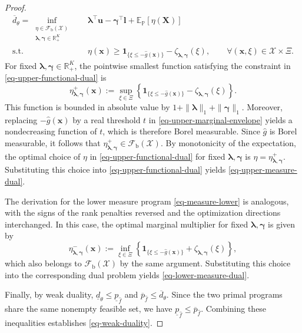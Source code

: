 \documentclass[review,11pt,3p,authoryear,nopreprintline]{elsarticle}
\begin{document}
\begin{proof}
  \begin{equation}
    \begin{aligned}
      \overline d_\theta
      =\inf_{\substack{\eta\in\mathcal F_{\mathrm b}(\mathcal X)\\
      \bm\lambda,\bm\gamma\in\mathbb R_+^K}}
      \quad &\bm\lambda^\top\bm u-\bm\gamma^\top\bm l+\mathbb E_{\mathbb P}\left[\eta(\bm X)\right]\\
      \text{s.t.}\quad & \eta(\bm x)\ge
      \mathbf1_{\{\xi\le-\hat g(\bm x)\}}
      -\zeta_{\bm\lambda,\bm\gamma}(\xi),
      \qquad\forall(\bm x,\xi)\in\mathcal X\times\Xi.
    \end{aligned}
    \label{eq-upper-functional-dual}
  \end{equation}
  For fixed $\bm\lambda,\bm\gamma\in\mathbb R_+^K$, the pointwise smallest function satisfying the constraint in \eqref{eq-upper-functional-dual} is
  \begin{equation}
    \eta^+_{\bm\lambda,\bm\gamma}(\bm x)
    :=\sup_{\xi\in\Xi}\left\{
      \mathbf1_{\{\xi\le-\hat g(\bm x)\}}
      -\zeta_{\bm\lambda,\bm\gamma}(\xi)
    \right\}.
    \label{eq-upper-marginal-envelope}
  \end{equation}
  This function is bounded in absolute value by $1+\|\bm\lambda\|_1+\|\bm\gamma\|_1$. Moreover, replacing $-\hat g(\bm x)$ by a real threshold $t$ in \eqref{eq-upper-marginal-envelope} yields a nondecreasing function of $t$, which is therefore Borel measurable. Since $\hat g$ is Borel measurable, it follows that $\eta^+_{\bm\lambda,\bm\gamma}\in\mathcal F_{\mathrm b}(\mathcal X)$. By monotonicity of the expectation, the optimal choice of $\eta$ in \eqref{eq-upper-functional-dual} for fixed $\bm\lambda,\bm\gamma$ is $\eta=\eta^+_{\bm\lambda,\bm\gamma}$. Substituting this choice into \eqref{eq-upper-functional-dual} yields \eqref{eq-upper-measure-dual}.

  The derivation for the lower measure program \eqref{eq-measure-lower} is analogous, with the signs of the rank penalties reversed and the optimization directions interchanged. In this case, the optimal marginal multiplier for fixed $\bm\lambda,\bm\gamma$ is given by
  \begin{equation}
    \eta^-_{\bm\lambda,\bm\gamma}(\bm x)
    :=\inf_{\xi\in\Xi}\left\{
      \mathbf1_{\{\xi\le-\hat g(\bm x)\}}
      +\zeta_{\bm\lambda,\bm\gamma}(\xi)
    \right\},
    \label{eq-lower-marginal-envelope}
  \end{equation}
  which also belongs to $\mathcal F_{\mathrm b}(\mathcal X)$ by the same argument. Substituting this choice into the corresponding dual problem yields \eqref{eq-lower-measure-dual}.

  Finally, by weak duality, $\underline d_\theta\le\underline p_{\hat f}$ and $\overline p_{\hat f}\le\overline d_\theta$. Since the two primal programs share the same nonempty feasible set, we have $\underline p_{\hat f}\le\overline p_{\hat f}$. Combining these inequalities establishes \eqref{eq-weak-duality}.
\end{proof}
\end{document}

